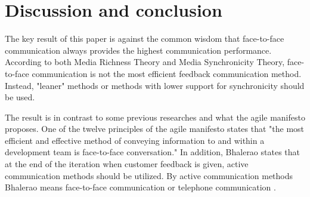 \documentclass[conference]{IEEEtran}
\begin{document}
\begin{comment}

NOPEA PÄÄTELMÄ: 
MST: Feedback: 

Contexti: Familiar, käytännössä siis: high conveyance, low convergence ==> less synchronicity

P1: Lower synchronicity
P2: Trasmission velocity improves synchronicity -> Lower transmission velovity
P3: Parallelism lower synchronicity -> High parallelism
P4(a): Natural symbols support synchronicity -> Use unnatural symbols
P4(b): Symbols better suited to content support synchronicity -> Use ill suited symbols
P5: Rehearsability lowers synchronicity -> High rehearsability
P6: Reproducability lowers synch -> High reproducability

--> 

lower transmission velocity, high parallelism, reharsability is important, high reprocessability -> Elektoriseen muotoon


\section{Call for new methods for feedback communication}

\textbf{TODO:} Why there's a need for new methods?

\textbf{TODO:} Introduce Hannotaatio

\textbf{TODO:} Evaluate Hannotaatio based on MRT and MST

\end{comment}

\section{Discussion and conclusion}

The key result of this paper is against the common wisdom that face-to-face communication always provides the highest communication performance. According to both Media Richness Theory and Media Synchronicity Theory, face-to-face communication is not the most efficient feedback communication method. Instead, "leaner" methods or methods with lower support for synchronicity should be used.

The result is in contrast to some previous researches and what the agile manifesto proposes. One of the twelve principles of the agile manifesto states that "the most efficient and effective method of conveying information to and within a development team is face-to-face conversation." \cite{agilemanifesto} In addition, Bhalerao states that at the end of the iteration when customer feedback is given, active communication methods should be utilized. By active communication methods Bhalerao means face-to-face communication or telephone communication \cite{2010bhalerao}.
\end{document}

